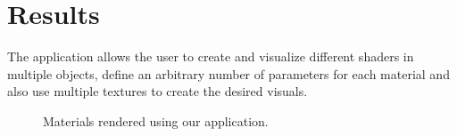 \section{Results}
The application allows the user to create and visualize different shaders in multiple objects, define an arbitrary number of parameters for each material and also use multiple textures to create the desired visuals.

\begin{figure*}[!t]
\centering
{}
\hfil
{}
\caption{Materials rendered using our application.}
\end{figure*}
